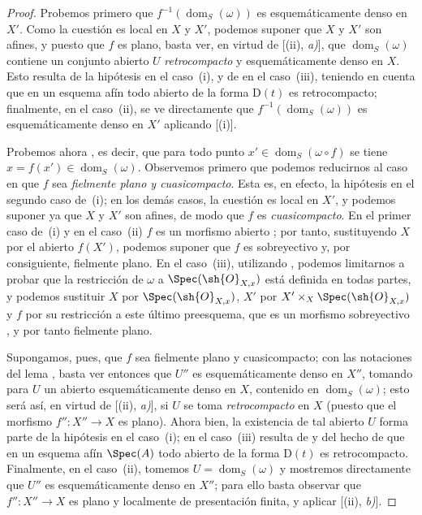 \begin{proof}
Probemos primero que $f^{-1}(\operatorname{dom}_S(\omega))$ es esquemáticamente denso en $X'$.
Como la cuestión es local en $X$ y $X'$, podemos suponer que $X$ y $X'$ son afines, y puesto que $f$ es plano, basta ver, en virtud de [(ii), \emph{a)}], que $\operatorname{dom}_S(\omega)$ contiene un conjunto abierto $U$ \emph{retrocompacto} y esquemáticamente denso en $X$.
Esto resulta de la hipótesis en el caso~(i), y de  en el caso~(iii), teniendo en cuenta que en un esquema afín todo abierto de la forma $\mathrm{D}(t)$ es retrocompacto; finalmente, en el caso~(ii), se ve directamente que $f^{-1}(\operatorname{dom}_S(\omega))$ es esquemáticamente denso en $X'$ aplicando [(i)].

Probemos ahora , es decir, que para todo punto $x'\in\operatorname{dom}_S(\omega\circ f)$ se tiene $x=f(x')\in\operatorname{dom}_S(\omega)$.
Observemos primero que podemos reducirnos al caso en que $f$ sea \emph{fielmente plano y cuasicompacto}.
Esta es, en efecto, la hipótesis en el segundo caso de~(i); en los demás casos, la cuestión es local en $X'$, y podemos suponer ya que $X$ y $X'$ son afines, de modo que $f$ es \emph{cuasicompacto}.
En el primer caso de~(i) y en el caso~(ii) $f$ es un morfismo abierto ; por tanto, sustituyendo $X$ por el abierto $f(X')$, podemos suponer que $f$ es sobreyectivo y, por consiguiente, fielmente plano.
En el caso~(iii), utilizando , podemos limitarnos a probar que la restricción de $\omega$ a $\Spec(\sh{O}_{X,x})$ está definida en todas partes, y podemos sustituir $X$ por $\Spec(\sh{O}_{X,x})$, $X'$ por $X'\times_X\Spec(\sh{O}_{X,x})$ y $f$ por su restricción a este último preesquema, que es un morfismo sobreyectivo , y por tanto fielmente plano.

Supongamos, pues, que $f$ sea fielmente plano y cuasicompacto; con las notaciones del lema , basta ver entonces que $U''$ es esquemáticamente denso en $X''$, tomando para $U$ un abierto esquemáticamente denso en $X$, contenido en $\operatorname{dom}_S(\omega)$; esto será así, en virtud de [(ii), \emph{a)}], si $U$ se toma \emph{retrocompacto} en $X$ (puesto que el morfismo $f'':X''\to X$ es plano).
Ahora bien, la existencia de tal abierto $U$ forma parte de la hipótesis en el caso~(i); en el caso~(iii) resulta de  y del hecho de que en un esquema afín $\Spec(A)$ todo abierto de la forma $\mathrm{D}(t)$ es retrocompacto.
Finalmente, en el caso~(ii), tomemos $U=\operatorname{dom}_S(\omega)$ y mostremos directamente que $U''$ es esquemáticamente denso en $X''$; para ello basta observar que $f'':X''\to X$ es plano y localmente de presentación finita, y aplicar [(ii), \emph{b)}].
\end{proof}

